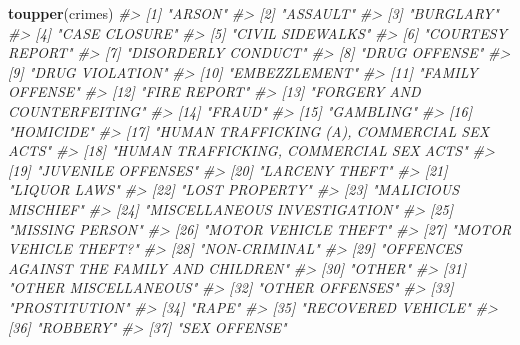 \documentclass[
  12pt,
]{book}
\newenvironment{Shaded}{\begin{snugshade}}{\end{snugshade}}
\newcommand{\CommentTok}[1]{\textcolor[rgb]{0.56,0.35,0.01}{\textit{#1}}}
\newcommand{\KeywordTok}[1]{\textcolor[rgb]{0.13,0.29,0.53}{\textbf{#1}}}
\newcommand{\NormalTok}[1]{#1}
\begin{document}
\begin{Shaded}
\begin{Highlighting}[]
\KeywordTok{toupper}\NormalTok{(crimes)}
\CommentTok{\#>  [1] "ARSON"                                     }
\CommentTok{\#>  [2] "ASSAULT"                                   }
\CommentTok{\#>  [3] "BURGLARY"                                  }
\CommentTok{\#>  [4] "CASE CLOSURE"                              }
\CommentTok{\#>  [5] "CIVIL SIDEWALKS"                           }
\CommentTok{\#>  [6] "COURTESY REPORT"                           }
\CommentTok{\#>  [7] "DISORDERLY CONDUCT"                        }
\CommentTok{\#>  [8] "DRUG OFFENSE"                              }
\CommentTok{\#>  [9] "DRUG VIOLATION"                            }
\CommentTok{\#> [10] "EMBEZZLEMENT"                              }
\CommentTok{\#> [11] "FAMILY OFFENSE"                            }
\CommentTok{\#> [12] "FIRE REPORT"                               }
\CommentTok{\#> [13] "FORGERY AND COUNTERFEITING"                }
\CommentTok{\#> [14] "FRAUD"                                     }
\CommentTok{\#> [15] "GAMBLING"                                  }
\CommentTok{\#> [16] "HOMICIDE"                                  }
\CommentTok{\#> [17] "HUMAN TRAFFICKING (A), COMMERCIAL SEX ACTS"}
\CommentTok{\#> [18] "HUMAN TRAFFICKING, COMMERCIAL SEX ACTS"    }
\CommentTok{\#> [19] "JUVENILE OFFENSES"                         }
\CommentTok{\#> [20] "LARCENY THEFT"                             }
\CommentTok{\#> [21] "LIQUOR LAWS"                               }
\CommentTok{\#> [22] "LOST PROPERTY"                             }
\CommentTok{\#> [23] "MALICIOUS MISCHIEF"                        }
\CommentTok{\#> [24] "MISCELLANEOUS INVESTIGATION"               }
\CommentTok{\#> [25] "MISSING PERSON"                            }
\CommentTok{\#> [26] "MOTOR VEHICLE THEFT"                       }
\CommentTok{\#> [27] "MOTOR VEHICLE THEFT?"                      }
\CommentTok{\#> [28] "NON{-}CRIMINAL"                              }
\CommentTok{\#> [29] "OFFENCES AGAINST THE FAMILY AND CHILDREN"  }
\CommentTok{\#> [30] "OTHER"                                     }
\CommentTok{\#> [31] "OTHER MISCELLANEOUS"                       }
\CommentTok{\#> [32] "OTHER OFFENSES"                            }
\CommentTok{\#> [33] "PROSTITUTION"                              }
\CommentTok{\#> [34] "RAPE"                                      }
\CommentTok{\#> [35] "RECOVERED VEHICLE"                         }
\CommentTok{\#> [36] "ROBBERY"                                   }
\CommentTok{\#> [37] "SEX OFFENSE"                               }

\end{Highlighting}
\end{Shaded}
\end{document}
